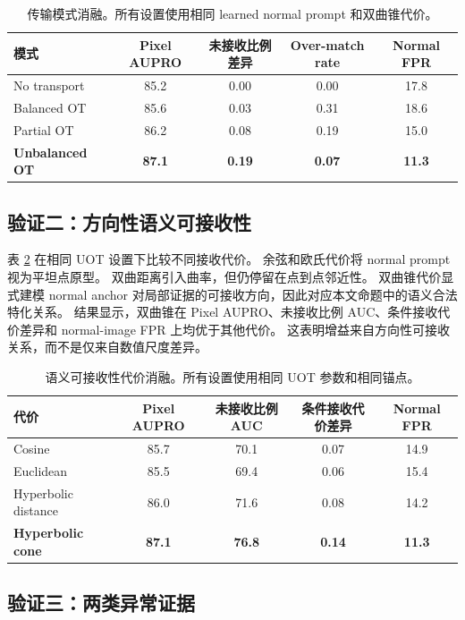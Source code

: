 \documentclass[UTF8,fontset=none,10pt]{ctexart}
\begin{document}
\begin{table}[t]
\centering
\caption{传输模式消融。所有设置使用相同 learned normal prompt 和双曲锥代价。}
\label{tab:transport}
\begin{tabular}{lcccc}
\toprule
模式 & Pixel AUPRO & 未接收比例差异 & Over-match rate & Normal FPR \\
\midrule
No transport & 85.2 & 0.00 & 0.00 & 17.8 \\
Balanced OT & 85.6 & 0.03 & 0.31 & 18.6 \\
Partial OT & 86.2 & 0.08 & 0.19 & 15.0 \\
\textbf{Unbalanced OT} & \textbf{87.1} & \textbf{0.19} & \textbf{0.07} & \textbf{11.3} \\
\bottomrule
\end{tabular}
\end{table}

\subsection{验证二：方向性语义可接收性}

表 \ref{tab:cost} 在相同 UOT 设置下比较不同接收代价。
余弦和欧氏代价将 normal prompt 视为平坦点原型。
双曲距离引入曲率，但仍停留在点到点邻近性。
双曲锥代价显式建模 normal anchor 对局部证据的可接收方向，因此对应本文命题中的语义合法特化关系。
结果显示，双曲锥在 Pixel AUPRO、未接收比例 AUC、条件接收代价差异和 normal-image FPR 上均优于其他代价。
这表明增益来自方向性可接收关系，而不是仅来自数值尺度差异。

\begin{table}[t]
\centering
\caption{语义可接收性代价消融。所有设置使用相同 UOT 参数和相同锚点。}
\label{tab:cost}
\begin{tabular}{lcccc}
\toprule
代价 & Pixel AUPRO & 未接收比例 AUC & 条件接收代价差异 & Normal FPR \\
\midrule
Cosine & 85.7 & 70.1 & 0.07 & 14.9 \\
Euclidean & 85.5 & 69.4 & 0.06 & 15.4 \\
Hyperbolic distance & 86.0 & 71.6 & 0.08 & 14.2 \\
\textbf{Hyperbolic cone} & \textbf{87.1} & \textbf{76.8} & \textbf{0.14} & \textbf{11.3} \\
\bottomrule
\end{tabular}
\end{table}

\subsection{验证三：两类异常证据}
\end{document}
